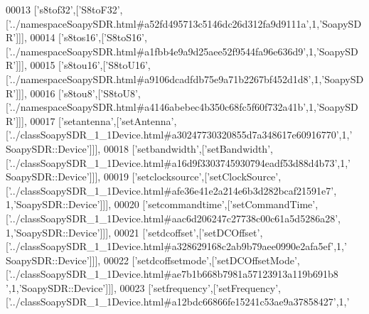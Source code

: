 \begin{DoxyCode}
00013   [\textcolor{stringliteral}{'s8tof32'},[\textcolor{stringliteral}{'S8toF32'},[\textcolor{stringliteral}{'../namespaceSoapySDR.html#a52fd495713c5146dc26d312fa9d9111a'},1,\textcolor{stringliteral}{'SoapySDR'}]]],
00014   [\textcolor{stringliteral}{'s8tos16'},[\textcolor{stringliteral}{'S8toS16'},[\textcolor{stringliteral}{'../namespaceSoapySDR.html#a1fbb4e9a9d25aee52f9544fa96e636d9'},1,\textcolor{stringliteral}{'SoapySDR'}]]],
00015   [\textcolor{stringliteral}{'s8tou16'},[\textcolor{stringliteral}{'S8toU16'},[\textcolor{stringliteral}{'../namespaceSoapySDR.html#a9106dcadfdb75e9a71b2267bf452d1d8'},1,\textcolor{stringliteral}{'SoapySDR'}]]],
00016   [\textcolor{stringliteral}{'s8tou8'},[\textcolor{stringliteral}{'S8toU8'},[\textcolor{stringliteral}{'../namespaceSoapySDR.html#a4146abebec4b350c68fc5f60f732a41b'},1,\textcolor{stringliteral}{'SoapySDR'}]]],
00017   [\textcolor{stringliteral}{'setantenna'},[\textcolor{stringliteral}{'setAntenna'},[\textcolor{stringliteral}{'../classSoapySDR\_1\_1Device.html#a30247730320855d7a348617e60916770'},1,\textcolor{stringliteral}{'
      SoapySDR::Device'}]]],
00018   [\textcolor{stringliteral}{'setbandwidth'},[\textcolor{stringliteral}{'setBandwidth'},[\textcolor{stringliteral}{'../classSoapySDR\_1\_1Device.html#a16d9f3303745930794eadf53d88d4b73'},1,\textcolor{stringliteral}{'
      SoapySDR::Device'}]]],
00019   [\textcolor{stringliteral}{'setclocksource'},[\textcolor{stringliteral}{'setClockSource'},[\textcolor{stringliteral}{'../classSoapySDR\_1\_1Device.html#afe36e41e2a214e6b3d282bcaf21591e7'},
      1,\textcolor{stringliteral}{'SoapySDR::Device'}]]],
00020   [\textcolor{stringliteral}{'setcommandtime'},[\textcolor{stringliteral}{'setCommandTime'},[\textcolor{stringliteral}{'../classSoapySDR\_1\_1Device.html#aac6d206247c27738c00c61a5d5286a28'},
      1,\textcolor{stringliteral}{'SoapySDR::Device'}]]],
00021   [\textcolor{stringliteral}{'setdcoffset'},[\textcolor{stringliteral}{'setDCOffset'},[\textcolor{stringliteral}{'../classSoapySDR\_1\_1Device.html#a328629168c2ab9b79aee0990e2afa5ef'},1,\textcolor{stringliteral}{'
      SoapySDR::Device'}]]],
00022   [\textcolor{stringliteral}{'setdcoffsetmode'},[\textcolor{stringliteral}{'setDCOffsetMode'},[\textcolor{stringliteral}{'../classSoapySDR\_1\_1Device.html#ae7b1b668b7981a57123913a119b691b8
      '},1,\textcolor{stringliteral}{'SoapySDR::Device'}]]],
00023   [\textcolor{stringliteral}{'setfrequency'},[\textcolor{stringliteral}{'setFrequency'},[\textcolor{stringliteral}{'../classSoapySDR\_1\_1Device.html#a12bdc66866fe15241c53ae9a37858427'},1,\textcolor{stringliteral}{'
}
\end{DoxyCode}
